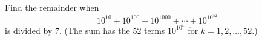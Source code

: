 Find the remainder when
\[10^{10}+10^{100}+10^{1000}+\cdots+10^{10^{52}}\]
is divided by $7$. (The sum has the $52$ terms $10^{10^k}$ for $k=1,2,\ldots,52$.)
